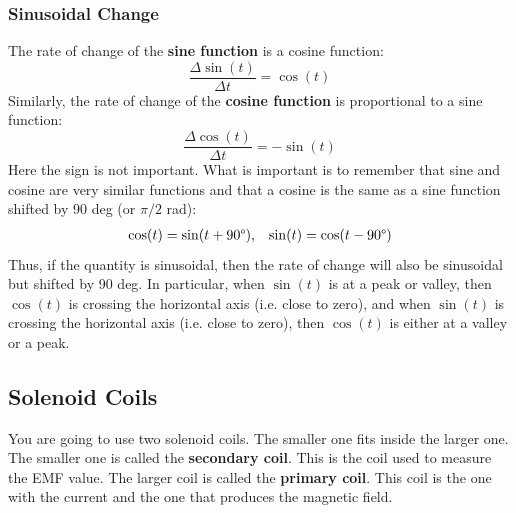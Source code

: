 \subsubsection{Sinusoidal Change}
%
The rate of change of the \textbf{sine function} is a cosine function:
\begin{equation}
	\frac{\Delta \sin(t)}{\Delta t} = \cos(t)
\end{equation}
Similarly, the rate of change of the \textbf{cosine function} is proportional to a sine function:
\begin{equation}
	\frac{\Delta \cos(t)}{\Delta t} = -\sin(t)
\end{equation}
Here the sign is not important. What is important is to remember that sine and cosine are very similar functions and that a cosine is the same as a sine function shifted by 90 deg (or $\pi/2$ rad):
\begin{align}
	\cos(t) = \sin(t + 90\text{\textdegree}), && \sin(t) = \cos(t - 90\text{\textdegree})
\end{align}
Thus, if the quantity is sinusoidal, then the rate of change will also be sinusoidal but shifted by 90 deg. In particular, when $\sin(t)$ is at a peak or valley, then $\cos(t)$ is crossing the horizontal axis (i.e. close to zero), and when $\sin(t)$ is crossing the horizontal axis (i.e. close to zero), then $\cos(t)$ is either at a valley or a peak.
%
\subsection{Solenoid Coils}
%
You are going to use two solenoid coils. The smaller one fits inside the larger one. The smaller one is called the \textbf{secondary coil}. This is the coil used to measure the EMF value. The larger coil is called the \textbf{primary coil}. This coil is the one with the current and the one that produces the magnetic field.

